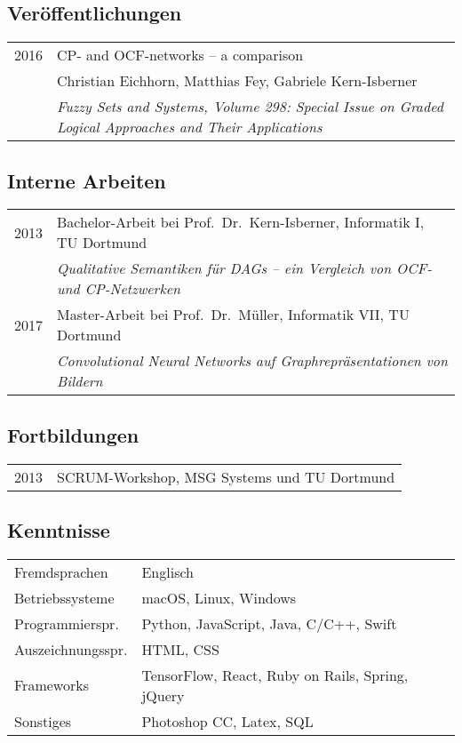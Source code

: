 \documentclass[10pt]{scrartcl}
\begin{document}
\subsection*{Veröffentlichungen}

\begin{tabular}{p{3cm}p{13cm}}
2016 & CP- and OCF-networks – a comparison\\
     & Christian Eichhorn, Matthias Fey, Gabriele Kern-Isberner\\
     & \textit{Fuzzy Sets and Systems, Volume 298: Special Issue on Graded Logical Approaches and Their Applications}\\
\end{tabular}

\subsection*{Interne Arbeiten}

\begin{tabular}{p{3cm}p{13cm}}
2013 & Bachelor-Arbeit bei Prof.~Dr.~Kern-Isberner, Informatik I, TU Dortmund\\
     & \textit{Qualitative Semantiken für DAGs – ein Vergleich von OCF- und CP-Netzwerken}\\
2017 & Master-Arbeit bei Prof.~Dr.~Müller, Informatik VII, TU Dortmund\\
     & \textit{Convolutional Neural Networks auf Graphrepräsentationen von Bildern}\\
\end{tabular}

\subsection*{Fortbildungen}

\begin{tabular}{p{3cm}p{13cm}}
2013 & SCRUM-Workshop, MSG Systems und TU Dortmund\\
\end{tabular}

\subsection*{Kenntnisse}

\begin{tabular}{p{3cm}p{13cm}}
Fremdsprachen     & Englisch\\
Betriebssysteme   & macOS, Linux, Windows\\
Programmierspr.   & Python, JavaScript, Java, C/C++, Swift\\
Auszeichnungsspr. & HTML, CSS\\
Frameworks        & TensorFlow, React, Ruby on Rails, Spring, jQuery\\
Sonstiges         & Photoshop CC, Latex, SQL\\
\end{tabular}
\end{document}
